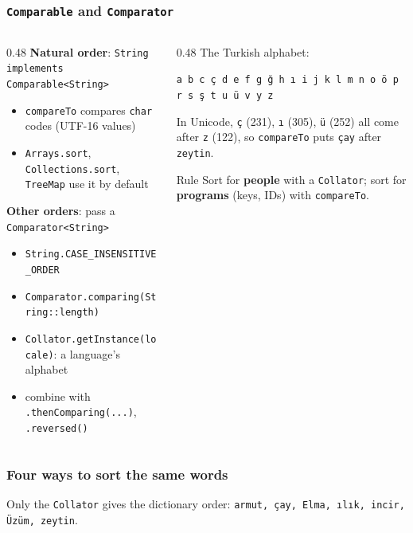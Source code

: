 \documentclass[aspectratio=169,10pt,compress]{beamer}
\begin{document}
\begin{frame}[t,fragile] \frametitle{\texttt{Comparable} and \texttt{Comparator}}
  \begin{columns}[T]
    \begin{column}{0.48\textwidth}
      \textbf{Natural order}: \texttt{String implements Comparable<String>}
      \begin{itemize}\small
        \item \texttt{compareTo} compares \texttt{char} codes (UTF-16 values)
        \item \texttt{Arrays.sort}, \texttt{Collections.sort}, \texttt{TreeMap} use it by default
      \end{itemize}
      \textbf{Other orders}: pass a \texttt{Comparator<String>}
      \begin{itemize}\small
        \item \texttt{String.CASE\_INSENSITIVE\_ORDER}
        \item \texttt{Comparator.comparing(String::length)}
        \item \texttt{Collator.getInstance(locale)}: a language's alphabet
        \item combine with \texttt{.thenComparing(...)}, \texttt{.reversed()}
      \end{itemize}
    \end{column}
    \begin{column}{0.48\textwidth}
      \small The Turkish alphabet:

      \vspace{0.3em}
      \texttt{a b c ç d e f g ğ h ı i j k l m n o ö p r s ş t u ü v y z}

      \vspace{0.5em}
      In Unicode, \texttt{ç} (231), \texttt{ı} (305), \texttt{ü} (252) all come after \texttt{z} (122),
      so \texttt{compareTo} puts \texttt{çay} after \texttt{zeytin}.
      \begin{alertblock}{Rule}
        \small Sort for \textbf{people} with a \texttt{Collator};
        sort for \textbf{programs} (keys, IDs) with \texttt{compareTo}.
      \end{alertblock}
    \end{column}
  \end{columns}
\end{frame}




\begin{frame}[t,fragile] \frametitle{Four ways to sort the same words}

  \vspace{0.3em}
  \small Only the \texttt{Collator} gives the dictionary order: \texttt{armut, çay, Elma, ılık, incir, Üzüm, zeytin}.
\end{frame}
\end{document}
